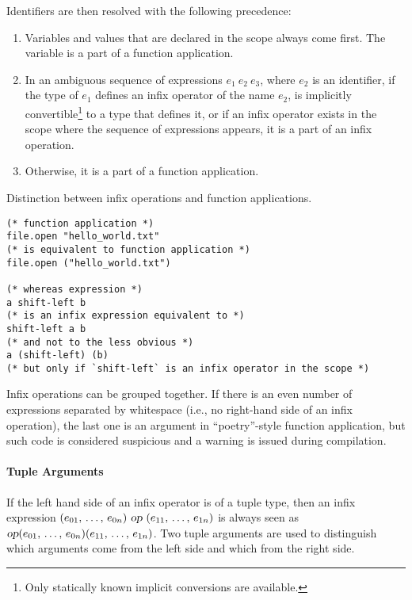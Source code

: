 Identifiers are then resolved with the following precedence:
\begin{enumerate}
  \item Variables and values that are declared in the scope always come first. The variable is a part of a function application. 
  \item In an ambiguous sequence of expressions $e_1\ e_2\ e_3$, where $e_2$ is an identifier, if the type of $e_1$ defines an infix operator of the name $e_2$, is implicitly convertible\footnote{Only statically known implicit conversions are available.} to a type that defines it, or if an infix operator exists in the scope where the sequence of expressions appears, it is a part of an infix operation. 
  \item Otherwise, it is a part of a function application.  
\end{enumerate}

\example Distinction between infix operations and function applications. 
\begin{lstlisting}[deletekeywords={open}]
(* function application *)
file.open "hello_world.txt"
(* is equivalent to function application *)
file.open ("hello_world.txt")

(* whereas expression *)
a shift-left b
(* is an infix expression equivalent to *)
shift-left a b
(* and not to the less obvious *)
a (shift-left) (b)
(* but only if `shift-left` is an infix operator in the scope *)
\end{lstlisting}

Infix operations can be grouped together. If there is an even number of expressions separated by whitespace (i.e., no right-hand side of an infix operation), the last one is an argument in ``poetry''-style function application, but such code is considered suspicious and a warning is issued during compilation. 





\paragraph{Tuple Arguments}

If the left hand side of an infix operator is of a tuple type, then an infix expression $(e_{01} ,\, \ldots ,\, e_{0n})\ \mbox{\sl op}\ (e_{11} ,\, \ldots ,\, e_{1n})$ is always seen as $\mbox{\sl op}(e_{01} ,\, \ldots ,\, e_{0n})(e_{11} ,\, \ldots ,\, e_{1n})$. Two tuple arguments are used to distinguish which arguments come from the left side and which from the right side. 





